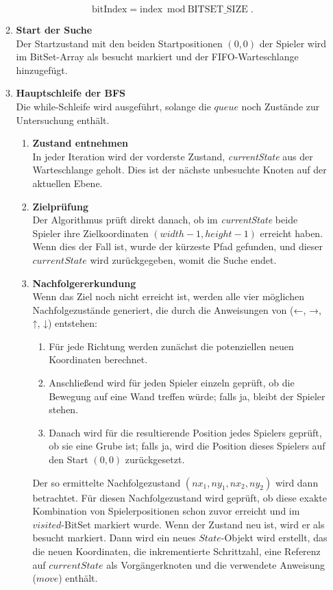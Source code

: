 \documentclass[a4paper,10pt,ngerman]{scrartcl}
\begin{document}
\begin{enumerate}
\begin{enumerate}
        \begin{equation}
         \text{bitIndex} = \text{index} \bmod \text{BITSET\_SIZE}.
  \label{5}
        \end{equation}
    \item \textbf{Start der Suche}\\
        Der Startzustand mit den beiden Startpositionen $(0,0)$ der Spieler wird im BitSet-Array als besucht markiert und der FIFO-Warteschlange hinzugefügt.  
    \item \textbf{Hauptschleife der BFS}\\
    Die while-Schleife wird ausgeführt, solange die $queue$ noch Zustände zur Untersuchung enthält.
    \begin{enumerate}
      \item \textbf{Zustand entnehmen}\\
      In jeder Iteration wird der vorderste Zustand, \textit{currentState} aus der Warteschlange geholt. Dies ist der nächste unbesuchte Knoten auf der aktuellen Ebene.
      \item \textbf{Zielprüfung}\\
      Der Algorithmus prüft direkt danach, ob im \textit{currentState} beide Spieler ihre Zielkoordinaten $(width-1, height-1)$ erreicht haben. Wenn dies der Fall ist, wurde der kürzeste Pfad gefunden, und dieser $currentState$ wird zurückgegeben, womit die Suche endet. 
      \item \textbf{Nachfolgererkundung}\\
      Wenn das Ziel noch nicht erreicht ist, werden alle vier möglichen Nachfolgezustände generiert, die durch die Anweisungen von (←, →, ↑, ↓) entstehen: 
      \begin{enumerate}
        \item Für jede Richtung werden zunächst die potenziellen neuen Koordinaten berechnet. 
        \item Anschließend wird für jeden Spieler einzeln geprüft, ob die Bewegung auf eine Wand treffen würde; falls ja, bleibt der Spieler stehen. 
        \item Danach wird für die resultierende Position jedes Spielers geprüft, ob sie eine Grube ist; falls ja, wird die Position dieses Spielers auf den Start $(0, 0)$ zurückgesetzt. 
      \end{enumerate}
      Der so ermittelte Nachfolgezustand $(nx_1, ny_1, nx_2, ny_2)$ wird dann betrachtet. Für diesen Nachfolgezustand wird geprüft, ob diese exakte Kombination von Spielerpositionen schon zuvor erreicht und im $visited$-BitSet markiert wurde. Wenn der Zustand neu ist, wird er als besucht markiert. Dann wird ein neues $State$-Objekt wird erstellt, das die neuen Koordinaten, die inkrementierte Schrittzahl, eine Referenz auf $currentState$ als Vorgänger\-knoten und die verwendete Anweisung ($move$) enthält. 

\end{enumerate}
\end{enumerate}
\end{enumerate}
\end{document}
